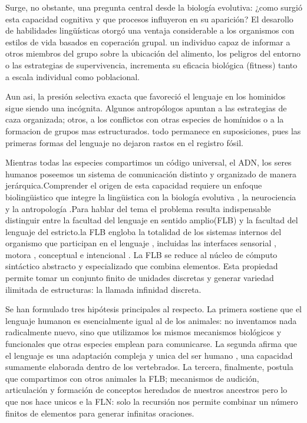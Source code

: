 \documentclass[12pt]{article}
\begin{document}
Surge, no obstante, una pregunta central desde la biología evolutiva: ¿como surgió esta capacidad cognitiva y que procesos influyeron en su aparición? El desarollo de habilidades lingüísticas otorgó una ventaja considerable a los organismos con estilos de vida basados en coperación grupal. un individuo capaz de informar a otros miembros del grupo sobre la ubicación del alimento, los peligros del entorno o las estrategias de supervivencia, incrementa su eficacia biológica (fitness) tanto a escala individual como poblacional.

Aun asi, la presión selectiva exacta que favoreció el lenguaje en los hominidos sigue siendo una incógnita. Algunos antropólogos apuntan a las estrategias de caza organizada; otros, a los conflictos con otras especies de homínidos o a la formacion de grupos mas estructurados. todo permanece en suposiciones, pues las primeras formas del lenguaje no dejaron rastos en el registro fósil.

Mientras todas las especies compartimos un código universal, el ADN, los seres humanos poseemos un sistema  de comunicación distinto y organizado de manera jerárquica.Comprender el origen de esta capacidad requiere un enfoque  biolingüistico que integre la lingüistica con la biología evolutiva , la neurociencia y la antropología .Para hablar del tema el problema resulta indispensable distinguir entre la facultad del lenguaje en sentido amplio(FLB) y la facultad del lenguaje del estricto.la FLB engloba la totalidad de los sistemas internos del organismo que participan en el lenguaje , incluidas las interfaces sensorial , motora , conceptual e intencional . La FLB se reduce  al núcleo  de cómputo sintáctico abstracto y especializado que combina elementos. Esta propiedad permite tomar un conjunto finito de unidades discretas y generar variedad ilimitada de estructuras: la llamada infinidad discreta.

Se han formulado tres hipótesis principales al respecto. La primera sostiene que el lenguaje humanon es esencialmente igual al de los animales: no inventamos nada radicalmente nuevo, sino que utilizamos los mismos mecanismos biológicos  y funcionales que otras especies emplean para comunicarse. La segunda afirma que el lenguaje es una adaptación compleja y unica del ser humano , una capacidad sumamente elaborada dentro de los vertebrados. La tercera, finalmente, postula que compartimos con otros animales la FLB; mecanismos de audición, articulación y formación de conceptos heredados de nuestros ancestros pero lo que nos hace unicos e la FLN: solo la recursión nos permite combinar un número finitos de elementos para generar infinitas oraciones.
\end{document}
